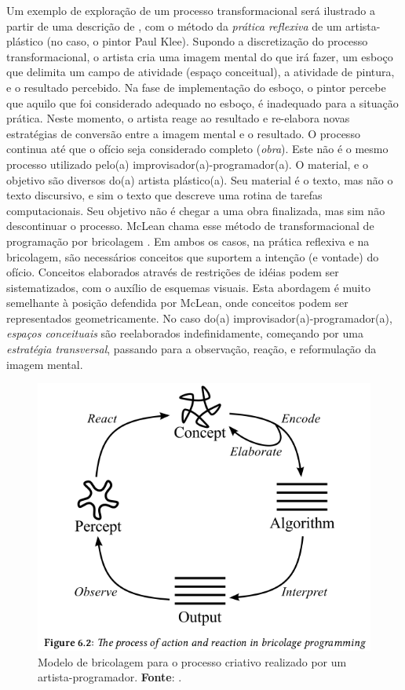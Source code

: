 {Um exemplo de exploração de um processo transformacional será ilustrado a partir de uma descrição de ,  com o método da \emph{prática reflexiva} de um artista-plástico (no caso, o pintor Paul Klee). Supondo a discretização do processo transformacional, o artista cria uma imagem mental do que irá fazer, um esboço que delimita um campo de atividade (espaço conceitual), a atividade de pintura, e o resultado percebido.  Na fase de implementação do esboço, o pintor percebe que aquilo que foi considerado adequado no esboço, é inadequado para a situação prática. Neste momento, o artista reage ao resultado e re-elabora novas estratégias de conversão entre a imagem mental e o resultado. O processo continua até que o ofício seja considerado completo (\emph{obra}). Este não é o mesmo processo utilizado pelo(a) improvisador(a)-programador(a). O material, e o objetivo são diversos do(a) artista plástico(a). Seu material é o texto, mas não o texto discursivo, e sim o texto que descreve uma rotina de tarefas computacionais. Seu objetivo não é chegar a uma obra finalizada, mas sim não descontinuar o processo. McLean chama esse método de transformacional de programação por bricolagem . Em ambos os casos, na prática reflexiva e na bricolagem, são necessários conceitos que suportem a intenção (e vontade) do ofício. Conceitos elaborados através de restrições de idéias podem ser sistematizados, com o auxílio de esquemas visuais. Esta abordagem é muito semelhante à posição defendida por McLean, onde conceitos podem ser representados geometricamente. No caso do(a) improvisador(a)-programador(a), \emph{espaços conceituais} são reelaborados indefinidamente, começando por uma \emph{estratégia transversal}, passando para a observação, reação, e reformulação da imagem mental.

 \begin{figure}[h]
  \centering
  \includegraphics[scale=0.5]{imagens/processo_criativo.png}
  \caption{Modelo de bricolagem para o processo criativo realizado por um artista-programador. \textbf{Fonte}: . }
  \label{fig:processo_criativo}
\end{figure}

}
